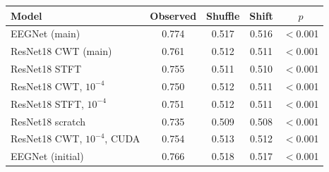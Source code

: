 \begin{tabular}{@{}lcccc@{}}
\toprule
Model & Observed & Shuffle & Shift & $p$ \\
\midrule
EEGNet (main) & 0.774 & 0.517 & 0.516 & $<$0.001 \\
ResNet18 CWT (main) & 0.761 & 0.512 & 0.511 & $<$0.001 \\
ResNet18 STFT & 0.755 & 0.511 & 0.510 & $<$0.001 \\
ResNet18 CWT, $10^{-4}$ & 0.750 & 0.512 & 0.511 & $<$0.001 \\
ResNet18 STFT, $10^{-4}$ & 0.751 & 0.512 & 0.511 & $<$0.001 \\
ResNet18 scratch & 0.735 & 0.509 & 0.508 & $<$0.001 \\
ResNet18 CWT, $10^{-4}$, CUDA & 0.754 & 0.513 & 0.512 & $<$0.001 \\
EEGNet (initial) & 0.766 & 0.518 & 0.517 & $<$0.001 \\
\bottomrule
\end{tabular}
